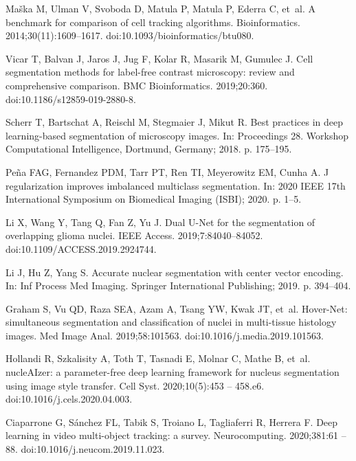 \documentclass[10pt,letterpaper]{article}
\begin{document}
\begin{thebibliography}{10}
Maška M, Ulman V, Svoboda D, Matula P, Matula P, Ederra C, et~al.
\newblock A benchmark for comparison of cell tracking algorithms.
\newblock Bioinformatics. 2014;30(11):1609--1617.
\newblock doi:{10.1093/bioinformatics/btu080}.

Vicar T, Balvan J, Jaros J, Jug F, Kolar R, Masarik M, Gumulec J.
\newblock Cell segmentation methods for label-free contrast microscopy: review and comprehensive comparison.
\newblock BMC Bioinformatics. 2019;20:360.
\newblock doi:{10.1186/s12859-019-2880-8}.

Scherr T, Bartschat A, Reischl M, Stegmaier J, Mikut R.
\newblock Best practices in deep learning-based segmentation of microscopy
  images.
\newblock In: Proceedings 28. Workshop Computational Intelligence, Dortmund,
  Germany; 2018. p. 175--195.

Peña FAG, Fernandez PDM, Tarr PT, Ren TI, Meyerowitz EM, Cunha A.
\newblock J regularization improves imbalanced multiclass segmentation.
\newblock In: 2020 IEEE 17th International Symposium on Biomedical Imaging
  (ISBI); 2020. p. 1--5.

{Li} X, {Wang} Y, {Tang} Q, {Fan} Z, {Yu} J.
\newblock Dual U-Net for the segmentation of overlapping glioma nuclei.
\newblock IEEE Access. 2019;7:84040--84052.
\newblock doi:{10.1109/ACCESS.2019.2924744}.

Li J, Hu Z, Yang S.
\newblock Accurate nuclear segmentation with center vector encoding.
\newblock In: Inf Process Med Imaging. Springer International Publishing; 2019.
  p. 394--404.

Graham S, Vu QD, Raza SEA, Azam A, Tsang YW, Kwak JT, et~al.
\newblock Hover-{N}et: simultaneous segmentation and classification of nuclei
  in multi-tissue histology images.
\newblock Med Image Anal. 2019;58:101563.
\newblock doi:{10.1016/j.media.2019.101563}.

Hollandi R, Szkalisity A, Toth T, Tasnadi E, Molnar C, Mathe B, et~al.
\newblock nucleAIzer: a parameter-free deep learning framework for nucleus
  segmentation using image style transfer.
\newblock Cell Syst. 2020;10(5):453 -- 458.e6.
\newblock doi:{10.1016/j.cels.2020.04.003}.

Ciaparrone G, Sánchez FL, Tabik S, Troiano L, Tagliaferri R, Herrera F.
\newblock Deep learning in video multi-object tracking: a survey.
\newblock Neurocomputing. 2020;381:61 -- 88.
\newblock doi:{10.1016/j.neucom.2019.11.023}.


\end{thebibliography}
\end{document}
